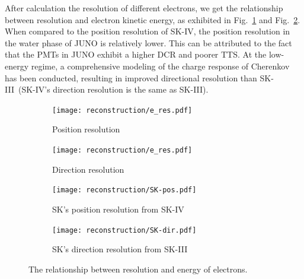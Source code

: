 After calculation the resolution of different electrons, we get the relationship between resolution and electron kinetic energy, as exhibited in Fig.~\ref{fig:res_pos} and Fig.~\ref{fig:dir_pos}. When compared to the position resolution of SK-IV, the position resolution in the water phase of JUNO is relatively lower. This can be attributed to the fact that the PMTs in JUNO exhibit a higher DCR and poorer TTS. At the low-energy regime, a comprehensive modeling of the charge response of Cherenkov has been conducted, resulting in improved directional resolution than SK-III~(SK-IV's direction resolution is the same as SK-III).
\begin{figure}[htbp]
	\begin{subfigure}{0.5\textwidth}
		\centering
		{\texttt{[image: reconstruction/e\_res.pdf]}}
		\caption{Position resolution}
		\label{fig:res_pos}
	\end{subfigure}%
	\hfill
	\begin{subfigure}{0.5\textwidth}
		\centering
		{\texttt{[image: reconstruction/e\_res.pdf]}}
		\caption{Direction resolution}
		\label{fig:dir_pos}
	\end{subfigure}%
	\hfill
	\begin{subfigure}{0.5\textwidth}
		\centering
		{\texttt{[image: reconstruction/SK-pos.pdf]}}
		\caption{SK's position resolution from SK-IV~\cite{SK4}}
		\label{fig:SKres_pos}
	\end{subfigure}%
	\hfill
	\begin{subfigure}{0.5\textwidth}
		\centering
		{\texttt{[image: reconstruction/SK-dir.pdf]}}
		\caption{SK's direction resolution from SK-III~\cite{SK3}}
		\label{fig:SKdir_pos}
	\end{subfigure}%
	\caption{The relationship between resolution and energy of electrons.}
\end{figure}

